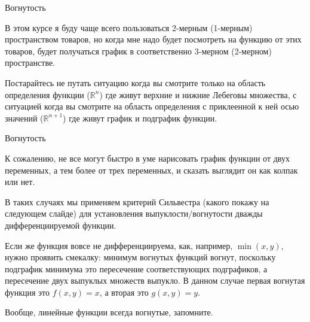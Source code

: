 \documentclass{beamer}
\begin{document}
\begin{frame}{Вогнутость}

В этом курсе я буду чаще всего пользоваться 2-мерным (1-мерным) пространством товаров, но когда мне надо будет посмотреть на функцию от этих товаров, будет получаться график в соответственно 3-мерном (2-мерном) пространстве.

Постарайтесь не путать ситуацию когда вы смотрите только на область определения функции ($\mathbb{R}^{n}$) где живут верхние и нижние Лебеговы множества, с ситуацией когда вы смотрите на область определения с приклеенной к ней осью значений ($\mathbb{R}^{n+1}$) где живут график и подграфик функции.

\end{frame}

\begin{frame}{Вогнутость}

К сожалению, не все могут быстро в уме нарисовать график функции от двух переменных, а тем более от трех переменных, и сказать выглядит он как колпак или нет.

В таких случаях мы применяем \alert{критерий Сильвестра} (какого покажу на следующем слайде) для установления выпуклости/вогнутости дважды дифференциируемой функции.

Если же функция вовсе не дифференциируема, как, например, $\min(x,y)$, нужно проявить смекалку: \alert {минимум вогнутых функций вогнут}, поскольку подграфик минимума это пересечение соответствующих подграфиков, а \alert{пересечение двух выпуклых множеств выпукло}. В данном случае первая вогнутая функция это $f(x,y) = x$, а вторая это $g(x,y) = y$. 

Вообще, \alert{линейные функции всегда вогнутые}, запомните.

\end{frame}
\end{document}
